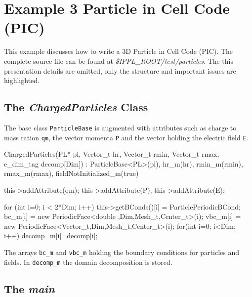 
 
 \section{Example 3 Particle in Cell Code (PIC)}
 This example discusses how to write a 3D Particle in Cell Code (PIC). The 
 complete source file can be found at {\em \$IPPL\_ROOT/test/particles}. The 
 this presentation details are omitted, only the structure and important issues are
 highlighted. 
 \subsection{The {\em ChargedParticles} Class}
 The base class {\tt ParticleBase} is augmented with attributes such as charge to mass ration
 {\tt qm}, the vector momenta {\tt P} and the vector holding the electric field {\tt E}. 
 \begin{code}
 ChargedParticles(PL* pl, Vector_t hr, Vector_t rmin, 
                  Vector_t rmax, e_dim_tag decomp[Dim]) :
                  ParticleBase<PL>(pl),
                  hr_m(hr),
                  rmin_m(rmin),
                  rmax_m(rmax),
                  fieldNotInitialized_m(true)
{
    this->addAttribute(qm);
    this->addAttribute(P);
    this->addAttribute(E);

    for (int i=0; i < 2*Dim; i++) {
        this->getBConds()[i] = ParticlePeriodicBCond;
        bc_m[i]  = new PeriodicFace<double  ,Dim,Mesh_t,Center_t>(i);
        vbc_m[i] = new PeriodicFace<Vector_t,Dim,Mesh_t,Center_t>(i);
    }
    for(int i=0; i<Dim; i++)
        decomp_m[i]=decomp[i];
}
\end{code}
The arrays {\tt bc\_m} and {\tt vbc\_m} holding the boundary conditions for particles and fields.
In {\tt decomp\_m} the domain decomposition is stored.

\subsection{The {\em main}}

